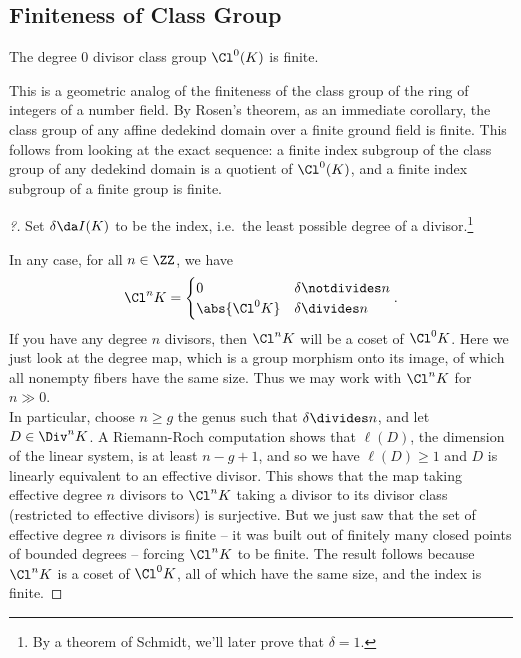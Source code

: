 \hypertarget{finiteness-of-class-group}{%
\subsection{Finiteness of Class Group}\label{finiteness-of-class-group}}

\begin{proposition}

The degree 0 divisor class group \(\Cl^0(K)\) is finite.

\end{proposition}

This is a geometric analog of the finiteness of the class group of the
ring of integers of a number field. By Rosen's theorem, as an immediate
corollary, the class group of any affine dedekind domain over a finite
ground field is finite. This follows from looking at the exact sequence:
a finite index subgroup of the class group of any dedekind domain is a
quotient of \(\Cl^0(K)\), and a finite index subgroup of a finite group
is finite.

\begin{proof}[?]

Set \(\delta \da I(K)\) to be the index, i.e.~the least possible degree
of a divisor.\footnote{By a theorem of Schmidt, we'll later prove that
  \(\delta = 1\).}

In any case, for all \(n\in \ZZ\), we have
\begin{align*}  
\Cl^n K = 
\begin{cases}
0 & \delta\notdivides n \\
\abs{\Cl^0 K} & \delta\divides n
\end{cases}
.\end{align*} If you have any degree \(n\) divisors, then \(\Cl^n K\)
will be a coset of \(\Cl^0 K\). Here we just look at the degree map,
which is a group morphism onto its image, of which all nonempty fibers
have the same size. Thus we may work with \(\Cl^n K\) for \(n\gg 0\).\\

In particular, choose \(n\geq g\) the genus such that
\(\delta \divides n\), and let \(D \in \Div^n K\). A Riemann-Roch
computation shows that \(\ell(D)\), the dimension of the linear system,
is at least \(n-g+1\), and so we have \(\ell(D) \geq 1\) and \(D\) is
linearly equivalent to an effective divisor. This shows that the map
taking effective degree \(n\) divisors to \(\Cl^n K\) taking a divisor
to its divisor class (restricted to effective divisors) is surjective.
But we just saw that the set of effective degree \(n\) divisors is
finite -- it was built out of finitely many closed points of bounded
degrees -- forcing \(\Cl^n K\) to be finite. The result follows because
\(\Cl^n K\) is a coset of \(\Cl^0 K\), all of which have the same size,
and the index is finite.

\end{proof}

